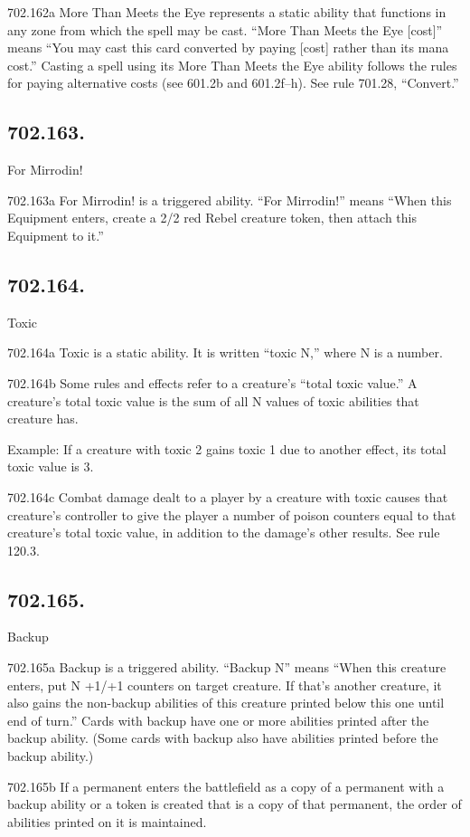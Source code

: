 702.162a More Than Meets the Eye represents a static ability that functions in any zone from which the spell may be cast. “More Than Meets the Eye [cost]” means “You may cast this card converted by paying [cost] rather than its mana cost.” Casting a spell using its More Than Meets the Eye ability follows the rules for paying alternative costs (see 601.2b and 601.2f–h). See rule 701.28, “Convert.”

\subsection*{702.163.}
For Mirrodin!

702.163a For Mirrodin! is a triggered ability. “For Mirrodin!” means “When this Equipment enters, create a 2/2 red Rebel creature token, then attach this Equipment to it.”

\subsection*{702.164.}
Toxic

702.164a Toxic is a static ability. It is written “toxic N,” where N is a number.

702.164b Some rules and effects refer to a creature’s “total toxic value.” A creature’s total toxic value is the sum of all N values of toxic abilities that creature has.

Example: If a creature with toxic 2 gains toxic 1 due to another effect, its total toxic value is 3.

702.164c Combat damage dealt to a player by a creature with toxic causes that creature’s controller to give the player a number of poison counters equal to that creature’s total toxic value, in addition to the damage’s other results. See rule 120.3.

\subsection*{702.165.}
Backup

702.165a Backup is a triggered ability. “Backup N” means “When this creature enters, put N +1/+1 counters on target creature. If that’s another creature, it also gains the non-backup abilities of this creature printed below this one until end of turn.” Cards with backup have one or more abilities printed after the backup ability. (Some cards with backup also have abilities printed before the backup ability.)

702.165b If a permanent enters the battlefield as a copy of a permanent with a backup ability or a token is created that is a copy of that permanent, the order of abilities printed on it is maintained.

